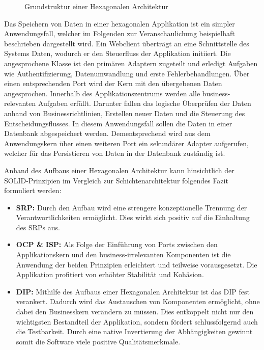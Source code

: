 \begin{figure}[htbp]
	\centering
	
	\caption{Grundstruktur einer Hexagonalen Architektur}
	\label{fig:HexagonaleArchitektur}
\end{figure}

Das Speichern von Daten in einer hexagonalen Applikation ist ein simpler Anwendungsfall, welcher im Folgenden zur Veranschaulichung beispielhaft beschrieben dargestellt wird. Ein Webclient überträgt an eine Schnittstelle des Systems Daten, wodurch er den Steuerfluss der Applikation initiiert. Die angesprochene Klasse ist den primären Adaptern zugeteilt und erledigt Aufgaben wie Authentifizierung, Datenumwandlung und erste Fehlerbehandlungen. Über einen entsprechenden Port wird der Kern mit den übergebenen Daten angesprochen. Innerhalb des Applikationszentrums werden alle business-relevanten Aufgaben erfüllt. Darunter fallen das logische Überprüfen der Daten anhand von Businessrichtlinien, Erstellen neuer Daten und die Steuerung des Entscheidungsflusses. In diesem Anwendungsfall sollen die Daten in einer Datenbank abgespeichert werden. Dementsprechend wird aus dem Anwendungskern über einen weiteren Port ein sekundärer Adapter aufgerufen, welcher für das Persistieren von Daten in der Datenbank zuständig ist.

Anhand des Aufbaus einer Hexagonalen Architektur kann hinsichtlich der SOLID-Prinzipien im Vergleich zur Schichtenarchitektur folgendes Fazit formuliert werden:

\begin{itemize}[topsep=-2pt]
	\item \textbf{\acrshort{SRP}: } {Durch den Aufbau wird eine strengere konzeptionelle Trennung der Verantwortlichkeiten ermöglicht. Dies wirkt sich positiv auf die Einhaltung des \acrlong{SRP}s aus.}
	\item \textbf{\acrshort{OCP} \& \acrshort{ISP}: } {Als Folge der Einführung von Ports zwischen den Applikationskern und den business-irrelevanten Komponenten ist die Anwendung der beiden Prinzipien erleichtert und teilweise vorausgesetzt. Die Applikation profitiert von erhöhter Stabilität und Kohäsion. }
	\item \textbf{\acrshort{DIP}: } {Mithilfe des Aufbaus einer Hexagonalen Architektur ist das \acrlong{DIP} fest verankert. Dadurch wird das Austauschen von Komponenten ermöglicht, ohne dabei den Businesskern verändern zu müssen. Dies entkoppelt nicht nur den wichtigsten Bestandteil der Applikation, sondern fördert schlussfolgernd auch die Testbarkeit. Durch eine native Invertierung der Abhängigkeiten gewinnt somit die Software viele positive Qualitätsmerkmale. \cite{Alliaume.2018, Martinez.2021}}
\end{itemize}


